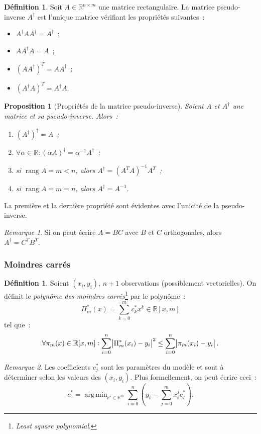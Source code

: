 \documentclass{article}
\newtheorem{prp}[thm]{Proposition}
\theoremstyle{definition}
\newtheorem{déf}[thm]{Définition}
\theoremstyle{remark}
\newtheorem*{rmq}{Remarque}
\DeclareMathOperator{\rg}{rang}  %
\DeclareMathOperator*{\argmin}{arg\,min}  %
\newcommand{\R}{\mathbb R}
\begin{document}
		\begin{déf} Soit $A \in \R^{n \times m}$ une matrice rectangulaire. La matrice pseudo-inverse $A^\dagger$ est l'unique matrice vérifiant les
		propriétés suivantes~:
		\begin{itemize}
			\item $A^\dagger A A^\dagger = A^\dagger$~;
			\item $A A^\dagger A = A$~;
			\item $(AA^\dagger)^T = AA^\dagger$~;
			\item $(A^\dagger A)^T = A^\dagger A$.
		\end{itemize}
		\end{déf}

		\begin{prp}[Propriétés de la matrice pseudo-inverse] Soient $A$ et $A^\dagger$ une matrice et sa pseudo-inverse. Alors~:
		\begin{enumerate}
			\item $(A^\dagger)^\dagger = A$~;
			\item $\forall \alpha \in \R : (\alpha A)^\dagger = \alpha^{-1}A^\dagger$~;
			\item si $\rg A = m < n$, alors $A^\dagger = (A^TA)^{-1}A^T$~;
			\item si $\rg A = m = n$, alors $A^\dagger = A^{-1}$.
		\end{enumerate}
		\end{prp}

		La première et la dernière propriété sont évidentes avec l'unicité de la pseudo-inverse.

		\begin{rmq} Si on peut écrire $A = BC$ avec $B$ et $C$ orthogonales, alors $A^\dagger = C^TB^T$. \end{rmq}

		\subsubsection{Moindres carrés}
		\begin{déf} Soient $(x_i, y_i)$, $n+1$ observations (possiblement vectorielles). On définit le \emph{polynôme des moindres carrés}\footnote{\emph{Least
		square polynomial}.} par le polynôme~:
		\[\Pi^*_m(x) = \sum_{k=0}^mc^*_kx^k \in \R[x, m]\]
		tel que~:
		\[\forall \pi_m(x) \in \R[x, m] : \sum_{i=0}^n\abs{\Pi_m^*(x_i) - y_i}^2 \leq \sum_{i=0}^n\abs{\pi_m(x_i) - y_i}.\]
		\end{déf}

		\begin{rmq} Les coefficients $c_j^*$ sont les paramètres du modèle et sont à déterminer selon les valeurs des $(x_i, y_i)$. Plus formellement, on peut
		écrire ceci~:
		\[c^* = \argmin_{c^* \in \R^m}\sum_{i=0}^n\left(y_i - \sum_{j=0}^mx_i^jc_j^*\right).\]
		\end{rmq}
\end{document}
